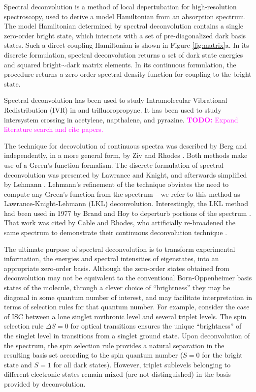\documentclass[12pt]{mitthesis}
\newcommand{\TODO} [1]{\textcolor{magenta}{\textbf{TODO:} #1}}
\begin{document}
Spectral deconvolution is a method of local depertubation for
high-resolution spectroscopy, used to derive a model Hamiltonian from
an absorption spectrum.  The model Hamiltonian determined by spectral
deconvolution contains a single zero-order bright state, which
interacts with a set of pre-diagonalized dark basis states.  Such a
direct-coupling Hamiltonian is shown in Figure \ref{fig:matrix}a.  In
its discrete formulation, spectral deconvolution returns a set of dark
state energies and squared bright$\sim$dark matrix elements.  In its
continuous formulation, the procedure returns a zero-order spectral
density function for coupling to the bright state.

Spectral deconvolution has been used to study Intramolecular
Vibrational Redistribution (IVR) in  and trifluoropropyne.  It
has been used to study intersystem crossing in acetylene, napthalene,
and pyrazine.  \TODO{Expand literature search and cite papers.}

The technique for decovolution of continuous spectra was described by
Berg and independently, in a more general form, by Ziv and Rhodes
\cite{berg76, ziv76}.  Both methods make use of a Green's function
formalism.  The discrete formulation of spectral deconvolution was
presented by Lawrance and Knight, and afterwards simplified by Lehmann
\cite{lawrance85, lehmann91}.  Lehmann's refinement of the technique
obviates the need to compute any Green's function from the spectrum --
we refer to this method as Lawrance-Knight-Lehmann (LKL)
deconvolution.  Interestingly, the LKL method had been used in 1977 by
Brand and Hoy to deperturb portions of the  spectrum
\cite{brand77}.  That work was cited by Cable and Rhodes, who
artificially re-broadened the same spectrum to demonstrate their
continuous deconvolution technique \cite{cable80}.

The ultimate purpose of spectral deconvolution is to transform
experimental information, the energies and spectral intensities of
eigenstates, into an appropriate zero-order basis.  Although the
zero-order states obtained from deconvolution may not be equivalent to
the conventional Born-Oppenheimer basis states of the molecule,
through a clever choice of ``brightness'' they may be diagonal in some
quantum number of interest, and may facilitate interpretation in terms
of selection rules for that quantum number.  For example, consider the
case of ISC between a lone singlet rovibronic level and several
triplet levels.  The spin selection rule $\Delta S=0$ for optical
transitions ensures the unique ``brightness'' of the singlet level in
transitions from a singlet ground state.  Upon deconvolution of the
spectrum, the spin selection rule provides a natural separation in the
resulting basis set according to the spin quantum number ($S=0$ for
the bright state and $S=1$ for all dark states).  However, triplet
sublevels belonging to different electronic states remain mixed (are
not distinguished) in the basis provided by deconvolution.
\end{document}
